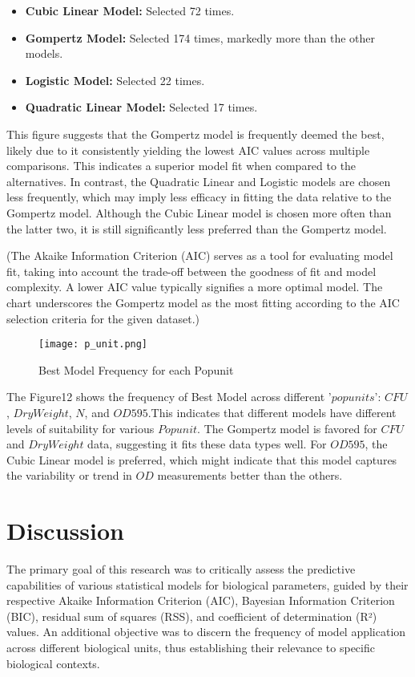 \documentclass[11pt]{article}
\begin{document}
\begin{itemize}
  \item \textbf{Cubic Linear Model:} Selected 72 times.
  \item \textbf{Gompertz Model:} Selected 174 times, markedly more than the other models.
  \item \textbf{Logistic Model:} Selected 22 times.
  \item \textbf{Quadratic Linear Model:} Selected 17 times.
\end{itemize}

This figure suggests that the Gompertz model is frequently deemed the best, likely due to it consistently yielding the lowest AIC values across multiple comparisons. This indicates a superior model fit when compared to the alternatives. In contrast, the Quadratic Linear and Logistic models are chosen less frequently, which may imply less efficacy in fitting the data relative to the Gompertz model. Although the Cubic Linear model is chosen more often than the latter two, it is still significantly less preferred than the Gompertz model.

(The Akaike Information Criterion (AIC) serves as a tool for evaluating model fit, taking into account the trade-off between the goodness of fit and model complexity. A lower AIC value typically signifies a more optimal model. The chart underscores the Gompertz model as the most fitting according to the AIC selection criteria for the given dataset.)

\begin{figure}[H]
\centering
\texttt{[image: p\_unit.png]} 
\caption{Best Model Frequency for each Popunit}
\label{fig:p_unit}
\end{figure}
The Figure12 shows the frequency of Best Model across different '$popunits$': $CFU$, $DryWeight$, $N$, and $OD595$.This indicates that different models have different levels of suitability for various $Popunit$. The Gompertz model is favored for $CFU$ and $DryWeight$ data, suggesting it fits these data types well. For $OD595$, the Cubic Linear model is preferred, which might indicate that this model captures the variability or trend in $OD$ measurements better than the others.


\section{Discussion}
The primary goal of this research was to critically assess the predictive capabilities of various statistical models for biological parameters, guided by their respective Akaike Information Criterion (AIC), Bayesian Information Criterion (BIC), residual sum of squares (RSS), and coefficient of determination (R²) values. An additional objective was to discern the frequency of model application across different biological units, thus establishing their relevance to specific biological contexts.
\end{document}
